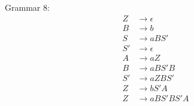 \documentclass[11pt]{article}
\begin{document}
Grammar 8:
\setcounter{equation}{0}
\begin{align}
Z &\rightarrow \epsilon\\
B &\rightarrow b\\
S &\rightarrow a B S'\\
S' &\rightarrow \epsilon\\
A &\rightarrow a Z\\
B &\rightarrow a B S' B\\
S' &\rightarrow a Z B S'\\
Z &\rightarrow b S' A\\
Z &\rightarrow a B S' B S' A
\end{align}

{}

\end{document}
